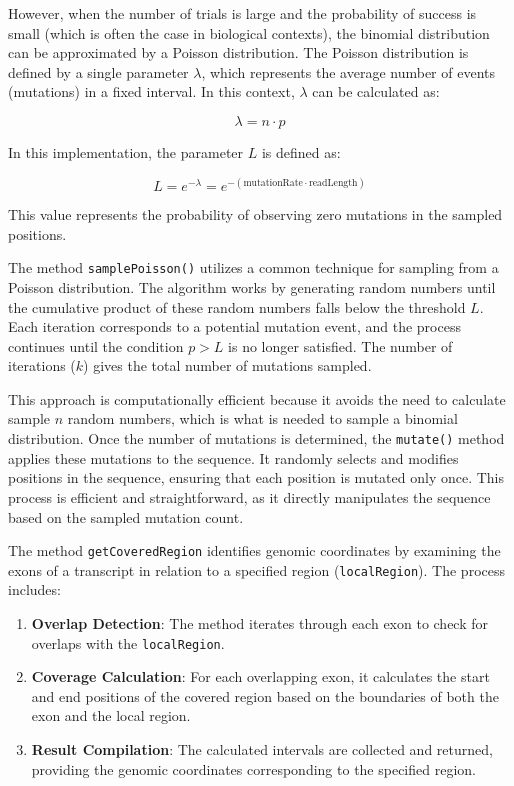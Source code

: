 \documentclass{article}
\begin{document}
    However, when the number of trials is large and the probability of success is small (which is often the case in biological contexts), the binomial distribution can be approximated by a Poisson distribution. The Poisson distribution is defined by a single parameter $\lambda$, which represents the average number of events (mutations) in a fixed interval. In this context, $\lambda$ can be calculated as:

    $$\lambda = n \cdot p$$

    In this implementation, the parameter $L$ is defined as:

    $$L = e^{-\lambda} = e^{-(\text{mutationRate} \cdot \text{readLength})}$$

    This value represents the probability of observing zero mutations in the sampled positions.


    The method \texttt{samplePoisson()} utilizes a common technique for sampling from a Poisson distribution. The algorithm works by generating random numbers until the cumulative product of these random numbers falls below the threshold $L$. Each iteration corresponds to a potential mutation event, and the process continues until the condition $p > L$ is no longer satisfied. The number of iterations ($k$) gives the total number of mutations sampled.

    This approach is computationally efficient because it avoids the need to calculate sample $n$ random numbers, which is what is needed to sample a binomial distribution. Once the number of mutations is determined, the \texttt{mutate()} method applies these mutations to the sequence. It randomly selects and modifies positions in the sequence, ensuring that each position is mutated only once. This process is efficient and straightforward, as it directly manipulates the sequence based on the sampled mutation count.


    The method \texttt{getCoveredRegion} identifies genomic coordinates by examining the exons of a transcript in relation to a specified region (\texttt{localRegion}). The process includes:

    \begin{enumerate}
        \item \textbf{Overlap Detection}: The method iterates through each exon to check for overlaps with the \texttt{localRegion}.
        \item \textbf{Coverage Calculation}: For each overlapping exon, it calculates the start and end positions of the covered region based on the boundaries of both the exon and the local region.
        \item \textbf{Result Compilation}: The calculated intervals are collected and returned, providing the genomic coordinates corresponding to the specified region.
    \end{enumerate}
\end{document}
